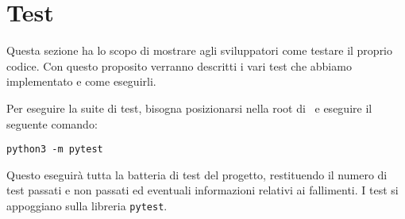 \section{Test}\label{Test}

Questa sezione ha lo scopo di mostrare agli sviluppatori come testare il proprio codice. Con questo proposito verranno descritti i vari test che abbiamo
implementato e come eseguirli.


Per eseguire la suite di test, bisogna posizionarsi nella root di \progetto\ e eseguire il seguente comando:

\begin{center}
    \texttt{python3 -m pytest}
\end{center}

Questo eseguirà tutta la batteria di test del progetto, restituendo il numero di test passati e non passati ed eventuali informazioni relativi ai fallimenti.
I test si appoggiano sulla libreria \texttt{pytest}.
